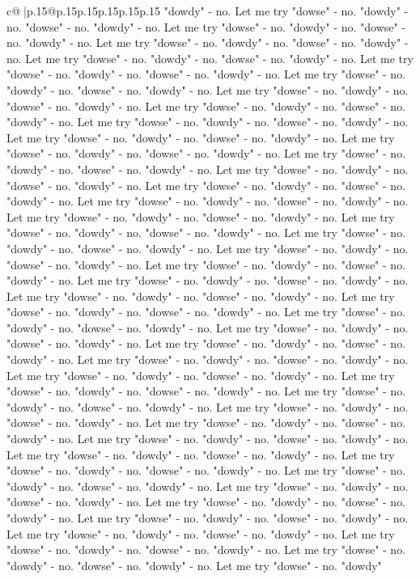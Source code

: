 \documentclass{article}
\begin{document}
{\begin{supertabular}{c@{$\;$}|p{.15\linewidth}@{}p{.15\linewidth}p{.15\linewidth}p{.15\linewidth}p{.15\linewidth}p{.15\linewidth}}
{{{"dowdy" {-} no. Let me try "dowse" {-} no. "dowdy" {-} no. "dowse" {-} no. "dowdy" {-} no. Let me try "dowse" {-} no. "dowdy" {-} no. "dowse" {-} no. "dowdy" {-} no. Let me try "dowse" {-} no. "dowdy" {-} no. "dowse" {-} no. "dowdy" {-} no. Let me try "dowse" {-} no. "dowdy" {-} no. "dowse" {-} no. "dowdy" {-} no. Let me try "dowse" {-} no. "dowdy" {-} no. "dowse" {-} no. "dowdy" {-} no. Let me try "dowse" {-} no. "dowdy" {-} no. "dowse" {-} no. "dowdy" {-} no. Let me try "dowse" {-} no. "dowdy" {-} no. "dowse" {-} no. "dowdy" {-} no. Let me try "dowse" {-} no. "dowdy" {-} no. "dowse" {-} no. "dowdy" {-} no. Let me try "dowse" {-} no. "dowdy" {-} no. "dowse" {-} no. "dowdy" {-} no. Let me try "dowse" {-} no. "dowdy" {-} no. "dowse" {-} no. "dowdy" {-} no. Let me try "dowse" {-} no. "dowdy" {-} no. "dowse" {-} no. "dowdy" {-} no. Let me try "dowse" {-} no. "dowdy" {-} no. "dowse" {-} no. "dowdy" {-} no. Let me try "dowse" {-} no. "dowdy" {-} no. "dowse" {-} no. "dowdy" {-} no. Let me try "dowse" {-} no. "dowdy" {-} no. "dowse" {-} no. "dowdy" {-} no. Let me try "dowse" {-} no. "dowdy" {-} no. "dowse" {-} no. "dowdy" {-} no. Let me try "dowse" {-} no. "dowdy" {-} no. "dowse" {-} no. "dowdy" {-} no. Let me try "dowse" {-} no. "dowdy" {-} no. "dowse" {-} no. "dowdy" {-} no. Let me try "dowse" {-} no. "dowdy" {-} no. "dowse" {-} no. "dowdy" {-} no. Let me try "dowse" {-} no. "dowdy" {-} no. "dowse" {-} no. "dowdy" {-} no. Let me try "dowse" {-} no. "dowdy" {-} no. "dowse" {-} no. "dowdy" {-} no. Let me try "dowse" {-} no. "dowdy" {-} no. "dowse" {-} no. "dowdy" {-} no. Let me try "dowse" {-} no. "dowdy" {-} no. "dowse" {-} no. "dowdy" {-} no. Let me try "dowse" {-} no. "dowdy" {-} no. "dowse" {-} no. "dowdy" {-} no. Let me try "dowse" {-} no. "dowdy" {-} no. "dowse" {-} no. "dowdy" {-} no. Let me try "dowse" {-} no. "dowdy" {-} no. "dowse" {-} no. "dowdy" {-} no. Let me try "dowse" {-} no. "dowdy" {-} no. "dowse" {-} no. "dowdy" {-} no. Let me try "dowse" {-} no. "dowdy" {-} no. "dowse" {-} no. "dowdy" {-} no. Let me try "dowse" {-} no. "dowdy" {-} no. "dowse" {-} no. "dowdy" {-} no. Let me try "dowse" {-} no. "dowdy" {-} no. "dowse" {-} no. "dowdy" {-} no. Let me try "dowse" {-} no. "dowdy" {-} no. "dowse" {-} no. "dowdy" {-} no. Let me try "dowse" {-} no. "dowdy" {-} no. "dowse" {-} no. "dowdy" {-} no. Let me try "dowse" {-} no. "dowdy" {-} no. "dowse" {-} no. "dowdy" {-} no. Let me try "dowse" {-} no. "dowdy" {-} no. "dowse" {-} no. "dowdy" {-} no. Let me try "dowse" {-} no. "dowdy" {-} no. "dowse" {-} no. "dowdy" {-} no. Let me try "dowse" {-} no. "dowdy" {-} no. "dowse" {-} no. "dowdy" {-} no. Let me try "dowse" {-} no. "dowdy" {-} no. "dowse" {-} no. "dowdy" {-} no. Let me try "dowse" {-} no. "dowdy" {-} no. "dowse" {-} no. "dowdy" {-} no. Let me try "dowse" {-} no. "dowdy" {-} no. "dowse" {-} no. "dowdy" {-} no. Let me try "dowse" {-} no. "dowdy" {-} no. "dowse" {-} no. "dowdy" {-} no. Let me try "dowse" {-} no. "dowdy" {-} no. "dowse" {-} no. "dowdy" {-} no. Let me try "dowse" {-} no. "dowdy" {-} no. "dowse" {-} no. "dowdy" {-} no. Let me try "dowse" {-} no. "dowdy" {-} no. "dowse" {-} no. "dowdy" {-} no. Let me try "dowse" {-} no. "dowdy" }}}
\end{supertabular}}
\end{document}
